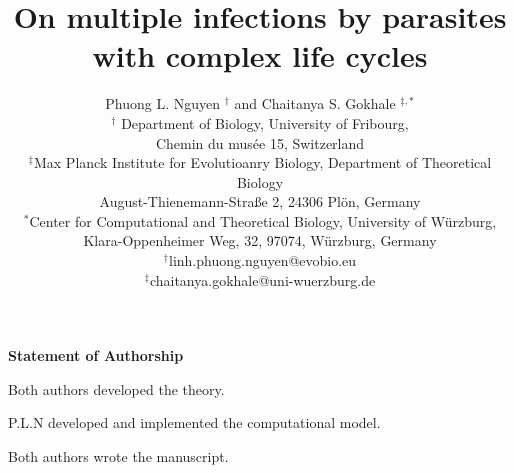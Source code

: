 \documentclass[a4paper]{scrartcl}
\begin{document}
\sffamily
\title{
On multiple infections by parasites with complex life cycles
}   
\author{Phuong L. Nguyen $^{\dag}$ and Chaitanya S. Gokhale $^{\ddag,\ast}$\\
\small{$^\dag$ Department of Biology, University of Fribourg,}\\
\small{Chemin du mus\'{e}e 15, Switzerland}\\
\small{$^\ddag$Max Planck Institute for Evolutioanry Biology, Department of Theoretical Biology}\\
\small{August-Thienemann-Stra{\ss}e 2, 24306 Pl\"{o}n, Germany}\\
\small{$^\ast$Center for Computational and Theoretical Biology, University of W\"{u}rzburg,}\\
\small{Klara-Oppenheimer Weg, 32, 97074, W\"{u}rzburg, Germany}\\
\small{$^\dag$linh.phuong.nguyen@evobio.eu}\\
\small{$^\ddag$chaitanya.gokhale@uni-wuerzburg.de}
}

\date{}
\maketitle

\textbf{Statement of Authorship}

Both authors developed the theory.

P.L.N developed and implemented the computational model.

Both authors wrote the manuscript.

\linenumbers

\end{document}
